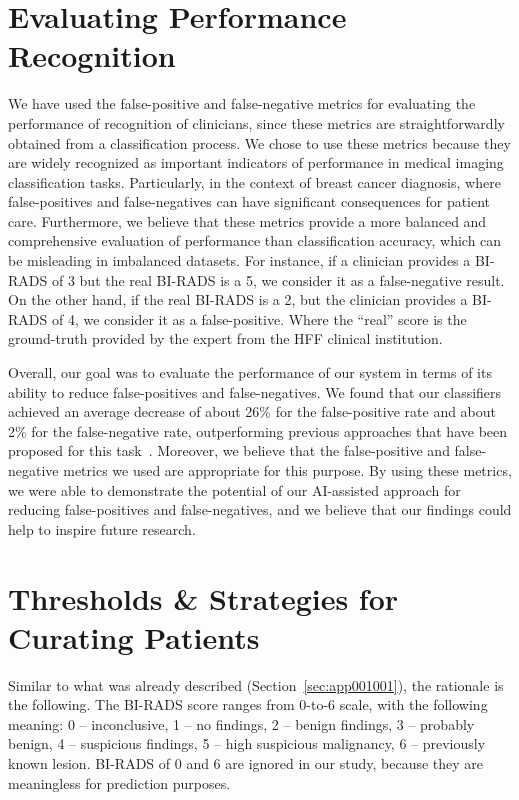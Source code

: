 \section{Evaluating Performance Recognition}
\label{sec:app001005}

We have used the false-positive and false-negative metrics for evaluating the performance of recognition of clinicians, since these metrics are straightforwardly obtained from a classification process.
We chose to use these metrics because they are widely recognized as important indicators of performance in medical imaging classification tasks.
Particularly, in the context of breast cancer diagnosis, where false-positives and false-negatives can have significant consequences for patient care.
Furthermore, we believe that these metrics provide a more balanced and comprehensive evaluation of performance than classification accuracy, which can be misleading in imbalanced datasets.
For instance, if a clinician provides a \ac{BI-RADS} of 3 but the real \ac{BI-RADS} is a 5, we consider it as a false-negative result.
On the other hand, if the real \ac{BI-RADS} is a 2, but the clinician provides a \ac{BI-RADS} of 4, we consider it as a false-positive.
Where the ``real'' score is the ground-truth provided by the expert from the \ac{HFF} clinical institution.

Overall, our goal was to evaluate the performance of our system in terms of its ability to reduce false-positives and false-negatives.
We found that our classifiers achieved an average decrease of about 26\% for the false-positive rate and about 2\% for the false-negative rate, outperforming previous approaches that have been proposed for this task~\cite{CALISTO2022102285}.
Moreover, we believe that the false-positive and false-negative metrics we used are appropriate for this purpose.
By using these metrics, we were able to demonstrate the potential of our \ac{AI}-assisted approach for reducing false-positives and false-negatives, and we believe that our findings could help to inspire future research.

\section{Thresholds \& Strategies for Curating Patients}
\label{sec:app001006}

Similar to what was already described (Section~\ref{sec:app001001}), the rationale is the following.
The \ac{BI-RADS} score ranges from 0-to-6 scale, with the following meaning:
0 -- inconclusive,
1 -- no findings,
2 -- benign findings,
3 -- probably benign,
4 -- suspicious findings,
5 -- high suspicious malignancy,
6 -- previously known lesion.
\ac{BI-RADS} of 0 and 6 are ignored in our study, because they are meaningless for prediction purposes.

